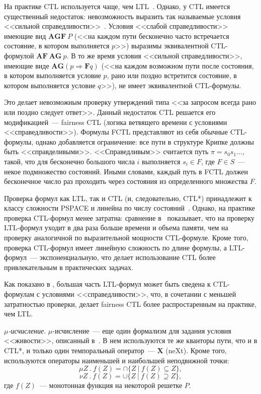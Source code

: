 \documentclass[a4paper,notitlepage,14pt]{article}
\begin{document}
На практике CTL используется чаще, чем LTL~\cite{Stirling96modaland}. Однако, у CTL
имеется существенный недостаток: невозможность выразить так называемые условия <<сильной
справедливости>>~\cite{Katoen,DBLP:conf/spin/FaragoS09}. Условия <<слабой справедливости>>
имеющие вид $\mathbf{AGF}~P$ (<<на каждом пути бесконечно часто встречается состояние, в
котором выполняется $p$>>) выразимы эквивалентной CTL-формулой $\mathbf{AF~AG}~p$. В то же
время условия <<сильной справедливости>>, имеющие виде $\mathbf{AG} (p \Rightarrow
\mathbf{F} q)$ (<<на каждом возможном пути после состояния, в котором выполняется условие
$p$, рано или поздно встретится состояние, в котором выполняется условие $q$>>), не имеет
эквивалентной CTL-формулы.

Это делает невозможным проверку утверждений типа <<за запросом всегда рано или поздно
следует ответ>>. Данный недостаток CTL решается его модификацией~--- fairness CTL (логика
ветвящего времени с условиями <<справедливости>>). Формулы FCTL представляют из себя
обычные CTL-формулы, однако добавляется ограничение: все пути в структуре Крипке должны
быть <<справделивыми>>. <<Справедливым>> считается путь $\pi = s_0s_1\ldots$, такой, что
для бесконечно большого числа $i$ выполняется $s_i \in F$, где $F \in S$~--- некое
подмножество состояний. Иными словами, каждый путь в FCTL должен бесконечное число раз
проходить через состояния из определенного множества $F$.

Проверка формул как LTL, так и CTL (и, следовательно, CTL*) принадлежит к классу сложности
PSPACE и линейна по числу состояний~\cite{Sistla85complexity}. Однако, на практике
проверка CTL-формул менее затратна: сравнение в~\cite{DBLP:conf/spin/FaragoS09}
показывает, что на проверку LTL-формул уходит в два раза больше времени и объема памяти,
чем на проверку аналогичной по выразительной мощности CTL-формуле. Кроме того, проверка
CTL-формул имеет линейную сложность по длине формулы, а LTL-формул~--- экспоненциальную,
что делает использование CTL более привлекательным в практических задачах.

Как показано в \cite{Clarke97anotherlook}, большая часть LTL-формул может быть сведена к
CTL-формулам с условиями <<справедливости>>, что, в сочетании с меньшей затратностью
проверки, делает fairness CTL более распростаренным на практике, чем LTL.


\textit{$\mu$-исчисление}. $\mu$-исчисление~--- еще один формализм для задания условия
<<живости>>, описанный в~\cite{Clarke}. В нем используются те же кванторы пути, что и в
CTL*, и только один темпоральный оператор~--- $\mathbf{X}$ (neXt). Кроме того,
используются операторы наименьшей и наибольшей неподвижной точки:
$$ \mu Z~.~f(Z) = \cap \{Z~|~f(Z) \subseteq Z\}, $$
$$ \nu Z~.~f(Z) = \cup \{Z~|~f(Z) \supseteq Z\}, $$
где $f(Z)$~--- монотонная функция на некоторой решетке $P$.
\end{document}
